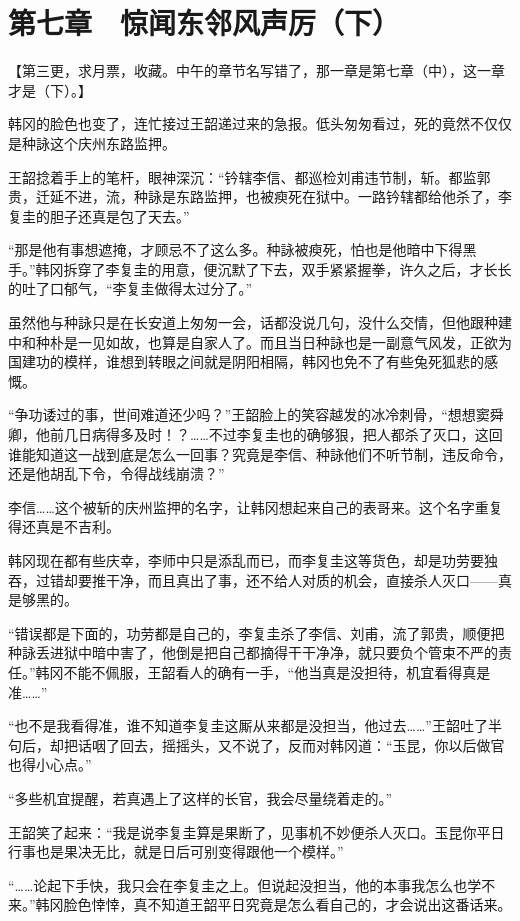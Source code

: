 \section{第七章　惊闻东邻风声厉（下）}

【第三更，求月票，收藏。中午的章节名写错了，那一章是第七章（中），这一章才是（下）。】

韩冈的脸色也变了，连忙接过王韶递过来的急报。低头匆匆看过，死的竟然不仅仅是种詠这个庆州东路监押。

王韶捻着手上的笔杆，眼神深沉：“钤辖李信、都巡检刘甫违节制，斩。都监郭贵，迁延不进，流，种詠是东路监押，也被瘐死在狱中。一路钤辖都给他杀了，李复圭的胆子还真是包了天去。”

“那是他有事想遮掩，才顾忌不了这么多。种詠被瘐死，怕也是他暗中下得黑手。”韩冈拆穿了李复圭的用意，便沉默了下去，双手紧紧握拳，许久之后，才长长的吐了口郁气，“李复圭做得太过分了。”

虽然他与种詠只是在长安道上匆匆一会，话都没说几句，没什么交情，但他跟种建中和种朴是一见如故，也算是自家人了。而且当日种詠也是一副意气风发，正欲为国建功的模样，谁想到转眼之间就是阴阳相隔，韩冈也免不了有些兔死狐悲的感慨。

“争功诿过的事，世间难道还少吗？”王韶脸上的笑容越发的冰冷刺骨，“想想窦舜卿，他前几日病得多及时！？……不过李复圭也的确够狠，把人都杀了灭口，这回谁能知道这一战到底是怎么一回事？究竟是李信、种詠他们不听节制，违反命令，还是他胡乱下令，令得战线崩溃？”

李信……这个被斩的庆州监押的名字，让韩冈想起来自己的表哥来。这个名字重复得还真是不吉利。

韩冈现在都有些庆幸，李师中只是添乱而已，而李复圭这等货色，却是功劳要独吞，过错却要推干净，而且真出了事，还不给人对质的机会，直接杀人灭口——真是够黑的。

“错误都是下面的，功劳都是自己的，李复圭杀了李信、刘甫，流了郭贵，顺便把种詠丢进狱中暗中害了，他倒是把自己都摘得干干净净，就只要负个管束不严的责任。”韩冈不能不佩服，王韶看人的确有一手，“他当真是没担待，机宜看得真是准……”

“也不是我看得准，谁不知道李复圭这厮从来都是没担当，他过去……”王韶吐了半句后，却把话咽了回去，摇摇头，又不说了，反而对韩冈道：“玉昆，你以后做官也得小心点。”

“多些机宜提醒，若真遇上了这样的长官，我会尽量绕着走的。”

王韶笑了起来：“我是说李复圭算是果断了，见事机不妙便杀人灭口。玉昆你平日行事也是果决无比，就是日后可别变得跟他一个模样。”

“……论起下手快，我只会在李复圭之上。但说起没担当，他的本事我怎么也学不来。”韩冈脸色悻悻，真不知道王韶平日究竟是怎么看自己的，才会说出这番话来。

